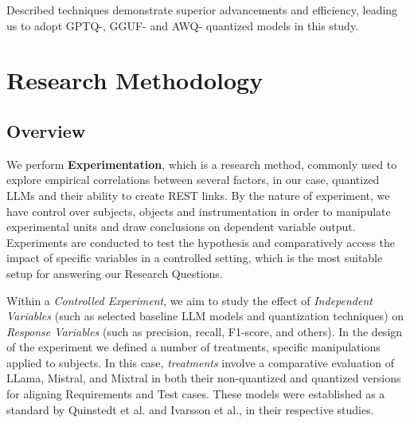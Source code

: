 \documentclass[conference]{IEEEtran}
\begin{document}
Described techniques demonstrate superior advancements and efficiency, leading us to adopt GPTQ-, GGUF- and AWQ- quantized models in this study.

\section{Research Methodology}\label{method}

\subsection{Overview}


We perform \textbf{Experimentation}\cite{wohlin2012experimentation}, which is a research method, commonly used
to explore empirical correlations between several factors, in our case,
quantized LLMs and their ability to create REST links. By the nature of
experiment, we have control over subjects, objects and instrumentation in order
to manipulate experimental units and draw conclusions on dependent variable
output. Experiments are conducted to test the hypothesis and comparatively
access the impact of specific variables in a controlled setting, which is the
most suitable setup for answering our Research Questions.

Within a \textit{Controlled Experiment}, we aim to study the effect of \textit{Independent
Variables} (such as selected baseline LLM models and quantization techniques) on
\textit{Response Variables} (such as precision, recall, F1-score, and others)\cite{wohlin2012experimentation}. In the
design of the experiment we defined a number of treatments, specific
manipulations applied to subjects\cite{wohlin2012experimentation}.  In this case, \textit{treatments} involve a
comparative evaluation of LLama, Mistral, and Mixtral in both their
non-quantized and quantized versions for aligning Requirements and Test cases.
These models were established as a standard by Quinstedt et al. and Ivarsson et
al.\cite{quinstedt2024Optimizing},\cite{ivarsson2023automated} in their respective studies. 
\end{document}
